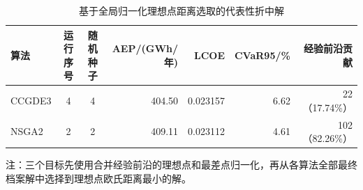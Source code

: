 \begin{table}[H]
\centering
\caption{基于全局归一化理想点距离选取的代表性折中解}
\label{tab:representative-solutions}
\begin{tabular}{lccrrrr}
\toprule
算法 & 运行序号 & 随机种子 & AEP/(GWh/年) & LCOE & CVaR95/\% & 经验前沿贡献 \\
\midrule
CCGDE3 & 4 & 4 & 404.50 & 0.023157 & 6.62 & 22（17.74\%） \\
NSGA2  & 2 & 2 & 409.11 & 0.023112 & 4.61 & 102（82.26\%） \\
\bottomrule
\end{tabular}
\begin{minipage}{0.94\textwidth}
\footnotesize 注：三个目标先使用合并经验前沿的理想点和最差点归一化，再从各算法全部最终档案解中选择到理想点欧氏距离最小的解。
\end{minipage}
\end{table}

